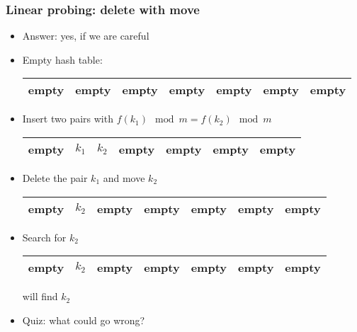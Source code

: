 \documentclass[trans]{beamer}
\begin{document}
\begin{frame}[fragile=singleslide]
\frametitle{Linear probing: delete with move}
\begin{itemize}
\item Answer: yes, if we are careful
\item Empty hash table:
\begin{tabular}{|p{1cm}|p{1cm}|p{1cm}|p{1cm}|p{1cm}|p{1cm}|p{1cm}|}
\hline 
empty & empty & empty & empty & empty & empty & empty \\
\hline 
\end{tabular}

\item Insert two pairs with $f(k_1) \mod m = f(k_2) \mod m$
\begin{tabular}{|p{1cm}|p{1cm}|p{1cm}|p{1cm}|p{1cm}|p{1cm}|p{1cm}|}
\hline 
empty & $k_1$ & $k_2$ & empty & empty & empty & empty \\
\hline 
\end{tabular}
\item Delete the pair $k_1$ and move $k_2$
\begin{tabular}{|p{1cm}|p{1cm}|p{1cm}|p{1cm}|p{1cm}|p{1cm}|p{1cm}|}
\hline 
empty & $k_2$ & empty & empty & empty & empty & empty \\
\hline 
\end{tabular}
\item Search for $k_2$
\begin{tabular}{|p{1cm}|p{1cm}|p{1cm}|p{1cm}|p{1cm}|p{1cm}|p{1cm}|}
\hline 
empty & $k_2$ & empty & empty & empty & empty & empty \\
\hline 
\end{tabular}

will find $k_2$
\item Quiz: what could go wrong?
\end{itemize}
\end{frame}
\end{document}
